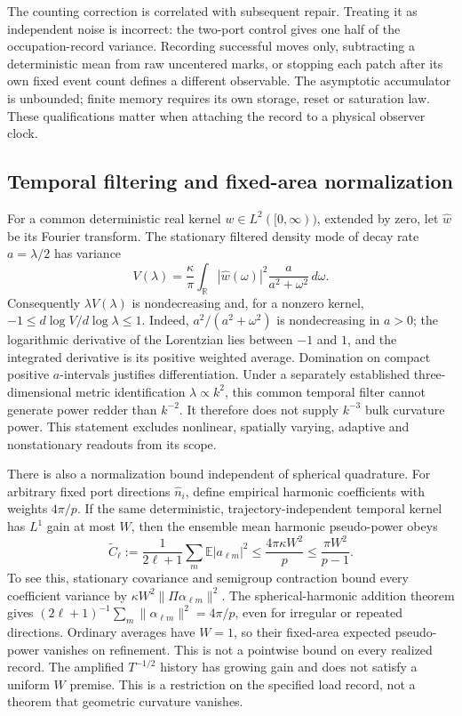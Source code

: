 The counting correction is correlated with subsequent repair. Treating it
as independent noise is incorrect: the two-port control gives one half
of the occupation-record variance. Recording successful moves only,
subtracting a deterministic mean from raw uncentered marks, or stopping
each patch after its own fixed event count defines a different observable.
The asymptotic accumulator is unbounded; finite memory requires its own
storage, reset or saturation law. These qualifications matter when
attaching the record to a physical observer clock.

\subsection{Temporal filtering and fixed-area normalization}
\label{subsec:native-filter-boundary}
For a common deterministic real kernel \(w\in L^2([0,\infty))\), extended
by zero, let \(\widehat w\) be its Fourier transform. The stationary
filtered density mode of decay rate \(a=\lambda/2\) has variance
\[
 V(\lambda)=\frac\kappa\pi\int_{\mathbb R}
       |\widehat w(\omega)|^2\frac a{a^2+\omega^2}\,d\omega.
\]
Consequently \(\lambda V(\lambda)\) is nondecreasing and, for a nonzero
kernel, \(-1\le d\log V/d\log\lambda\le1\). Indeed,
\(a^2/(a^2+\omega^2)\) is nondecreasing in \(a>0\); the logarithmic
derivative of the Lorentzian lies between \(-1\) and \(1\), and the
integrated derivative is its positive weighted average. Domination on
compact positive \(a\)-intervals justifies differentiation. Under a
separately established three-dimensional metric identification
\(\lambda\propto k^2\), this common temporal filter cannot generate
power redder than \(k^{-2}\). It therefore does not supply \(k^{-3}\)
bulk curvature power. This statement excludes nonlinear, spatially varying,
adaptive and nonstationary readouts from its scope.

There is also a normalization bound independent of spherical quadrature.
For arbitrary fixed port directions \(\hat n_i\), define empirical harmonic
coefficients with weights \(4\pi/p\). If the same deterministic,
trajectory-independent temporal kernel has \(L^1\) gain at most \(W\),
then the ensemble mean harmonic pseudo-power obeys
\[
 \widetilde C_\ell:=\frac1{2\ell+1}\sum_m\mathbb E|a_{\ell m}|^2
 \le\frac{4\pi\kappa W^2}{p}
                  \le\frac{\pi W^2}{p-1}.
\]
To see this, stationary covariance and semigroup contraction bound every
coefficient variance by \(\kappa W^2\|\Pi\alpha_{\ell m}\|^2\).
The spherical-harmonic addition theorem gives
\((2\ell+1)^{-1}\sum_m\|\alpha_{\ell m}\|^2=4\pi/p\), even for
irregular or repeated directions. Ordinary averages have \(W=1\), so
their fixed-area expected pseudo-power vanishes on refinement. This is
not a pointwise bound on every realized record. The amplified
\(T^{-1/2}\) history has growing gain and does not satisfy a uniform
\(W\) premise. This is a restriction on the specified load record,
not a theorem that geometric curvature vanishes.

